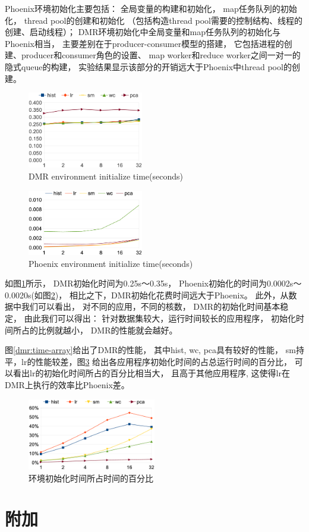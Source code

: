 Phoenix环境初始化主要包括：
全局变量的构建和初始化，
map任务队列的初始化，
thread pool的创建和初始化
（包括构造thread pool需要的控制结构、线程的创建、启动线程）；
DMR环境初始化中全局变量和map任务队列的初始化与Phoenix相当，
主要差别在于producer-consumer模型的搭建，
它包括进程的创建、producer和consumer角色的设置、
map worker和reduce worker之间一对一的隐式queue的构建，
实验结果显示该部分的开销远大于Phoenix中thread pool的创建。
\begin{figure}[!h!t]  
    \centering
    \includegraphics[width=0.45\textwidth]{img/dmr_spmcinit.eps}
    \caption{DMR environment initialize time(seconds)}
    \label{dmr:environment}
\end{figure}
\begin{figure}[!h!t]  
    \centering
    \includegraphics[width=0.45\textwidth]{img/phoenix_init.eps}
    \caption{Phoenix environment initialize time(seconds)}
    \label{phoenix:environment}
\end{figure}

如图\ref{dmr:environment}所示，
DMR初始化时间为0.25s～0.35s，
Phoenix初始化的时间为0.0002s～0.0020s(如图\ref{phoenix:environment})，
相比之下，DMR初始化花费时间远大于Phoenix。
此外，从数据中我们可以看出，
对不同的应用，不同的核数，
DMR的初始化时间基本稳定，
由此我们可以得出：
针对数据集较大，运行时间较长的应用程序，
初始化时间所占的比例就越小，
DMR的性能就会越好。


图\ref{dmr:time-array}给出了DMR的性能，
其中hist, wc, pca具有较好的性能，
sm持平，lr的性能较差，图\ref{dmr:init-percent}
给出各应用程序初始化时间的占总运行时间的百分比，
可以看出lr的初始化时间所占的百分比相当大，
且高于其他应用程序,
这使得lr在DMR上执行的效率比Phoenix差。

\begin{figure}[!h!t]  
    \centering
    \includegraphics[width=0.5\textwidth]{img/dmr_init_percent.eps}
    \caption{环境初始化时间所占时间的百分比}
    \label{dmr:init-percent}
\end{figure}
 


\section{附加}


